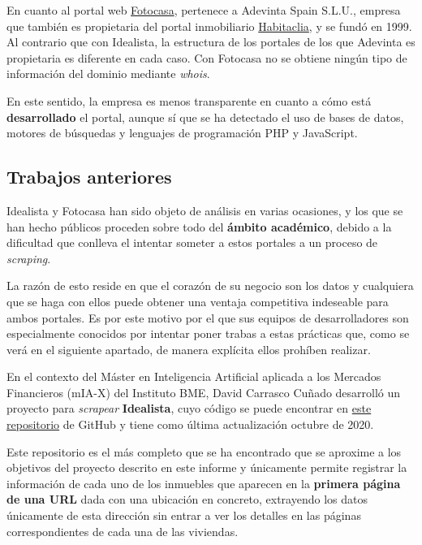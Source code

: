 \documentclass[12pt]{article}
\begin{document}
En cuanto al portal web \href{https://www.fotocasa.es/es/}{Fotocasa}, pertenece a Adevinta Spain S.L.U., empresa que también es propietaria del portal inmobiliario \href{https://www.habitaclia.com/madrid}{Habitaclia}, y se fundó en 1999. Al contrario que con Idealista, la estructura de los portales de los que Adevinta es propietaria es diferente en cada caso. Con Fotocasa no se obtiene ningún tipo de información del dominio mediante \textit{whois}. 

En este sentido, la empresa es menos transparente en cuanto a cómo está \textbf{desarrollado} el portal, aunque sí que se ha detectado el uso de bases de datos, motores de búsquedas y lenguajes de programación PHP y JavaScript.

\vspace{-1.5em}\subsection*{Trabajos anteriores}\vspace{-1.0em}

Idealista y Fotocasa han sido objeto de análisis en varias ocasiones, y los que se han hecho públicos proceden sobre todo del \textbf{ámbito académico}, debido a la dificultad que conlleva el intentar someter a estos portales a un proceso de \textit{scraping}.

La razón de esto reside en que el corazón de su negocio son los datos y cualquiera que se haga con ellos puede obtener una ventaja competitiva indeseable para ambos portales. Es por este motivo por el que sus equipos de desarrolladores son especialmente conocidos por intentar poner trabas a estas prácticas que, como se verá en el siguiente apartado, de manera explícita ellos prohíben realizar.

En el contexto del Máster en Inteligencia Artificial aplicada a los Mercados Financieros (mIA-X) del Instituto BME, David Carrasco Cuñado desarrolló un proyecto para \textit{scrapear} \textbf{Idealista}, cuyo código se puede encontrar en \href{https://github.com/David-Carrasco/Scrapy-Idealista}{este repositorio} de GitHub y tiene como última actualización octubre de 2020. 

Este repositorio es el más completo que se ha encontrado que se aproxime a los objetivos del proyecto descrito en este informe y únicamente permite registrar la información de cada uno de los inmuebles que aparecen en la \textbf{primera página de una URL} dada con una ubicación en concreto, extrayendo los datos únicamente de esta dirección sin entrar a ver los detalles en las páginas correspondientes de cada una de las viviendas. 
\end{document}
